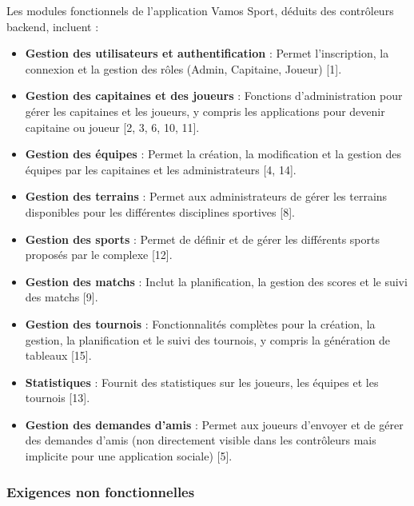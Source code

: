 \documentclass{article}
\begin{document}
Les modules fonctionnels de l'application Vamos Sport, déduits des contrôleurs backend, incluent :
\begin{itemize}
    \item \textbf{Gestion des utilisateurs et authentification} : Permet l'inscription, la connexion et la gestion des rôles (Admin, Capitaine, Joueur) [1].
    \item \textbf{Gestion des capitaines et des joueurs} : Fonctions d'administration pour gérer les capitaines et les joueurs, y compris les applications pour devenir capitaine ou joueur [2, 3, 6, 10, 11].
    \item \textbf{Gestion des équipes} : Permet la création, la modification et la gestion des équipes par les capitaines et les administrateurs [4, 14].
    \item \textbf{Gestion des terrains} : Permet aux administrateurs de gérer les terrains disponibles pour les différentes disciplines sportives [8].
    \item \textbf{Gestion des sports} : Permet de définir et de gérer les différents sports proposés par le complexe [12].
    \item \textbf{Gestion des matchs} : Inclut la planification, la gestion des scores et le suivi des matchs [9].
    \item \textbf{Gestion des tournois} : Fonctionnalités complètes pour la création, la gestion, la planification et le suivi des tournois, y compris la génération de tableaux [15].
    \item \textbf{Statistiques} : Fournit des statistiques sur les joueurs, les équipes et les tournois [13].
    \item \textbf{Gestion des demandes d'amis} : Permet aux joueurs d'envoyer et de gérer des demandes d'amis (non directement visible dans les contrôleurs mais implicite pour une application sociale) [5].
\end{itemize}

\subsubsection{Exigences non fonctionnelles}
\end{document}
